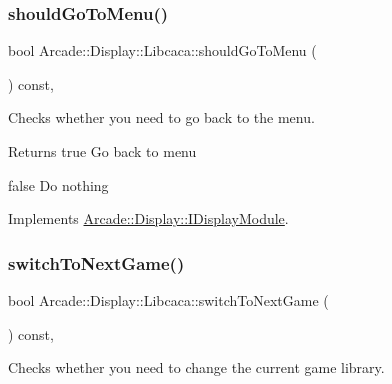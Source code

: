 \mbox{\label{classArcade_1_1Display_1_1Libcaca_aaa4a4a114dee18576dd93ca09808004e}} 
\subsubsection{\texorpdfstring{shouldGoToMenu()}{shouldGoToMenu()}}
{\footnotesize\ttfamily bool Arcade\+::\+Display\+::\+Libcaca\+::should\+Go\+To\+Menu (\begin{DoxyParamCaption}{ }\end{DoxyParamCaption}) const\hspace{0.3cm}{\ttfamily [final]}, {\ttfamily [virtual]}}



Checks whether you need to go back to the menu. 

\begin{DoxyReturn}{Returns}
true Go back to menu 

false Do nothing 
\end{DoxyReturn}


Implements \mbox{\hyperlink{classArcade_1_1Display_1_1IDisplayModule_ad060f6b99f2adffaf02a4226fc40d0ab}{Arcade\+::\+Display\+::\+I\+Display\+Module}}.

\mbox{\label{classArcade_1_1Display_1_1Libcaca_ab9f5be320196e902e43db50e0cdcce5e}} 
\subsubsection{\texorpdfstring{switchToNextGame()}{switchToNextGame()}}
{\footnotesize\ttfamily bool Arcade\+::\+Display\+::\+Libcaca\+::switch\+To\+Next\+Game (\begin{DoxyParamCaption}{ }\end{DoxyParamCaption}) const\hspace{0.3cm}{\ttfamily [final]}, {\ttfamily [virtual]}}



Checks whether you need to change the current game library. 

